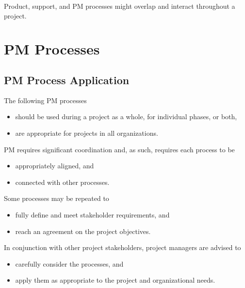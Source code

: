 \documentclass[letterpaper,10pt,english]{jupyterBook}
\begin{document}
\sphinxAtStartPar
Product, support, and PM processes might overlap and interact throughout a project.

\sphinxstepscope


\chapter{PM Processes}
\label{\detokenize{PM/pm-processes:pm-processes}}\label{\detokenize{PM/pm-processes::doc}}

\section{PM Process Application}
\label{\detokenize{PM/pm-processes:pm-process-application}}
\sphinxAtStartPar
The following PM processes
\begin{itemize}
\item {} 
\sphinxAtStartPar
should be used during a project as a whole, for individual phases, or both,

\item {} 
\sphinxAtStartPar
are appropriate for projects in all organizations.

\end{itemize}

\sphinxAtStartPar
PM requires significant coordination and, as such, requires each process to be
\begin{itemize}
\item {} 
\sphinxAtStartPar
appropriately aligned, and

\item {} 
\sphinxAtStartPar
connected with other processes.

\end{itemize}

\sphinxAtStartPar
Some processes may be repeated to
\begin{itemize}
\item {} 
\sphinxAtStartPar
fully define and meet stakeholder requirements, and

\item {} 
\sphinxAtStartPar
reach an agreement on the project objectives.

\end{itemize}

\sphinxAtStartPar
In conjunction with other project stakeholders, project managers are advised to
\begin{itemize}
\item {} 
\sphinxAtStartPar
carefully consider the processes, and

\item {} 
\sphinxAtStartPar
apply them as appropriate to the project and organizational needs.

\end{itemize}
\end{document}
